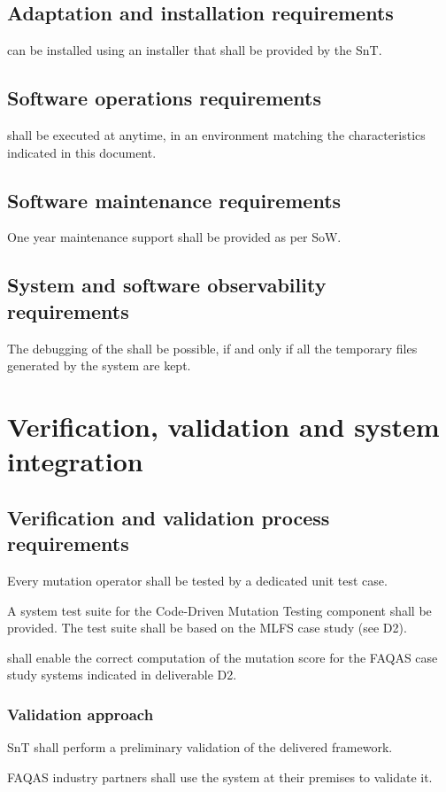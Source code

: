 \section{Adaptation and installation requirements}


% 
\RQ{} \FAQAS can be installed using an installer that shall be provided by the SnT.


\section{Software operations requirements}

\RQ{} \FAQAS shall be executed at anytime, 
in an environment matching the characteristics indicated in this document.

\section{Software maintenance requirements}

\RQ{} One year maintenance support shall be provided as per SoW.

\section{System and software observability requirements}

\RQ{} The debugging of the \FAQAS shall be possible, if and only if 
all the temporary files generated by the system are kept.

\chapter{Verification, validation and system integration}
 \section{Verification and validation process requirements}
 
\RQ{} Every mutation operator shall be tested by a dedicated unit test case.
 
 \RQ{} A system test suite for the Code-Driven Mutation Testing component shall be provided. The test suite shall be based on the MLFS case study (see D2).
 
 \RQ{} \FAQAS shall enable the correct computation of the mutation score for the FAQAS case study systems indicated in deliverable D2.
 
 \subsection{Validation approach}

\RQ{} SnT shall perform a preliminary validation of the delivered framework.

\RQ{} FAQAS industry partners shall use the system at their premises to validate it.
